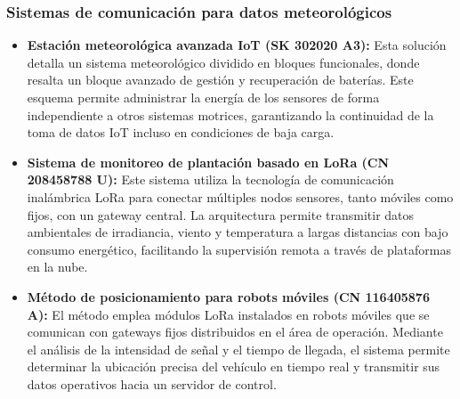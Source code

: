 \subsubsection{Sistemas de comunicación para datos meteorológicos}
\begin{itemize}
    \item \textbf{Estación meteorológica avanzada IoT (SK 302020 A3):} Esta solución detalla un sistema meteorológico dividido en bloques funcionales, donde resalta un bloque avanzado de gestión y recuperación de baterías. Este esquema permite administrar la energía de los sensores de forma independiente a otros sistemas motrices, garantizando la continuidad de la toma de datos IoT incluso en condiciones de baja carga.
    
    \item \textbf{Sistema de monitoreo de plantación basado en LoRa (CN 208458788 U):} Este sistema utiliza la tecnología de comunicación inalámbrica LoRa para conectar múltiples nodos sensores, tanto móviles como fijos, con un gateway central. La arquitectura permite transmitir datos ambientales de irradiancia, viento y temperatura a largas distancias con bajo consumo energético, facilitando la supervisión remota a través de plataformas en la nube.
    
    \item \textbf{Método de posicionamiento para robots móviles (CN 116405876 A):} El método emplea módulos LoRa instalados en robots móviles que se comunican con gateways fijos distribuidos en el área de operación. Mediante el análisis de la intensidad de señal y el tiempo de llegada, el sistema permite determinar la ubicación precisa del vehículo en tiempo real y transmitir sus datos operativos hacia un servidor de control.
\end{itemize}

